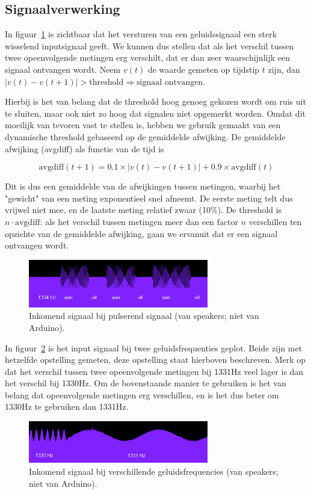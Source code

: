 \documentclass[a4paper,10pt]{article}
\begin{document}
\subsection{Signaalverwerking}
In figuur~\ref{fig:on_off} is zichtbaar dat het versturen van een geluidssignaal een sterk wisselend inputsignaal geeft. We kunnen dus stellen dat als het verschil tussen twee opeenvolgende metingen erg verschilt, dat er dan zeer waarschijnlijk een signaal ontvangen wordt. Neem $v(t)$ de waarde gemeten op tijdstip $t$ zijn, dan $|v(t) - v(t+1)| > \text{threshold} \Rightarrow \text{signaal ontvangen}$.

Hierbij is het van belang dat de threshold hoog genoeg gekozen wordt om ruis uit te sluiten, maar ook niet zo hoog dat signalen niet opgemerkt worden. Omdat dit moeilijk van tevoren vast te stellen is, hebben we gebruik gemaakt van een dynamische threshold gebaseerd op de gemiddelde afwijking. De gemiddelde afwijking (avgdiff) als functie van de tijd is

$$\text{avgdiff}(t+1) = 0.1\times |v(t) - v(t+1)| + 0.9\times\text{avgdiff}(t)$$

Dit is dus een gemiddelde van de afwijkingen tussen metingen, waarbij het "gewicht" van een meting exponentieel snel afneemt. De eerste meting telt dus vrijwel niet mee, en de laatste meting relatief zwaar (10\%). De threshold is $n\cdot\text{avgdiff}$: als het verschil tussen metingen meer dan een factor $n$ verschillen ten opzichte van de gemiddelde afwijking, gaan we ervanuit dat er een signaal ontvangen wordt.
\begin{figure}[ht!]
    \centering
    \includegraphics[width=0.7\textwidth]{resonance_on_off_commit_ff82f.png}
    \caption{Inkomend signaal bij pulserend signaal (van speakers; niet van Arduino).}
    \label{fig:on_off}
\end{figure}
\FloatBarrier

In figuur~\ref{fig:resonance} is het input signaal bij twee geluidsfrequenties geplot. Beide zijn met hetzelfde opstelling gemeten, deze opstelling staat hierboven beschreven. Merk op dat het verschil tussen twee opeenvolgende metingen bij 1331Hz veel lager is dan het verschil bij 1330Hz. Om de bovenstaande manier te gebruiken is het van belang dat opeenvolgende metingen erg verschillen, en is het dus beter om 1330Hz te gebruiken dan 1331Hz.
\begin{figure}[ht!]
    \centering
    \includegraphics[width=0.7\textwidth]{resonance_2_frequencies_commit_ff82f.png}
    \caption{Inkomend signaal bij verschillende geluidsfrequencies (van speakers; niet van Arduino).}
    \label{fig:resonance}
\end{figure}
\FloatBarrier
\end{document}
